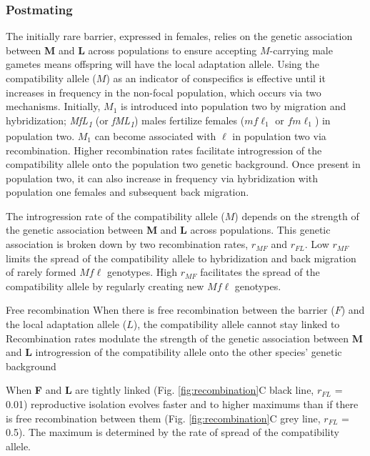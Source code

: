 \documentclass[11pt]{article}
\begin{document}
\subsubsection*{Postmating}

 The initially rare barrier, expressed in females, relies on the genetic association between \textbf{M} and \textbf{L} across populations to ensure accepting $M$-carrying male gametes means offspring will have the local adaptation allele. Using the compatibility allele ($M$) as an indicator of conspecifics is effective until it increases in frequency in the non-focal population, which occurs via two mechanisms. Initially, $M_1$ is introduced into population two by migration and hybridization; \textit{\texorpdfstring{MfL\textsubscript{1}}{MfL 1}} (or \textit{\texorpdfstring{fML\textsubscript{1}}{fML 1}}) males fertilize females ($mf\ell_1$ or $fm\ell_1$) in population two. $M_1$ can become associated with $\ell$ in population two via recombination. Higher recombination rates facilitate introgression of the compatibility allele onto the population two genetic background. Once present in population two, it can also increase in frequency via hybridization with population one females and subsequent back migration. 
 
The introgression rate of the compatibility allele ($M$) depends on the strength of the genetic association between \textbf{M} and \textbf{L} across populations. This genetic association is broken down by two recombination rates, $r_{MF}$ and $r_{FL}$. Low $r_{MF}$ limits the spread of the compatibility allele to hybridization and back migration of rarely formed $Mf\ell$ genotypes. High $r_{MF}$ facilitates the spread of the compatibility allele by regularly creating new $Mf\ell$ genotypes. 

Free recombination When there is free recombination between the barrier ($F$) and the local adaptation allele ($L$), the compatibility allele cannot stay linked to  Recombination rates modulate the strength of the genetic association between \textbf{M} and \textbf{L} introgression of the compatibility allele onto the other species' genetic background

When \textbf{F} and \textbf{L} are tightly linked (Fig. \ref{fig:recombination}C black line, $r_{FL}$ = 0.01) reproductive isolation evolves faster and to higher maximums than if there is free recombination between them (Fig. \ref{fig:recombination}C grey line, $r_{FL}$ = 0.5). The maximum is determined by the rate of spread of the compatibility allele.
\end{document}
